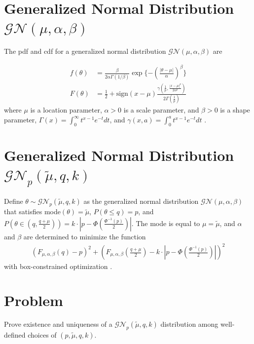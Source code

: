 \documentclass[useAMS,usenatbib]{biom}
\begin{document}
\section*{Generalized Normal Distribution $\mathcal{GN}(\mu,\alpha,\beta)$}
The pdf and cdf for a generalized normal distribution $\mathcal{GN}(\mu,\alpha,\beta)$ are

\begin{align*}
f(\theta)&=\frac{\beta}{2\alpha\Gamma(1/\beta)}\exp\{-(\frac{|\theta-\mu|}{\alpha})^\beta\}\\
F(\theta)&=\frac{1}{2}+\text{sign}(x-\mu)\frac{\gamma(\frac{1}{p},\frac{|x-\mu|^p}{2\alpha^p})}{2\Gamma(\frac{1}{p})}
\end{align*} where $\mu$ is a location parameter, $\alpha>0$ is a scale parameter, and $\beta>0$ is a shape parameter, $\Gamma(x)=\int_0^\infty t^{x-1}e^{-t}dt$, and $\gamma(x,a)=\int_0^a t^{x-1}e^{-t}dt$ \citep{Nadarajah2005}.

\section*{Generalized Normal Distribution $\mathcal{GN}_p(\tilde{\mu},q,k)$}
Define $\theta\sim\mathcal{GN}_p(\tilde{\mu},q,k)$ as the generalized normal distribution $\mathcal{GN}(\mu,\alpha,\beta)$ that satisfies mode$(\theta)=\tilde{\mu}$, $P(\theta\leq q)=p$, and $P(\theta\in(q,\frac{q+\mu}{2}))=k\cdot|p-\Phi(\frac{\Phi^{-1}(p)}{2})|$.
%
The mode is equal to $\mu=\tilde{\mu}$, and $\alpha$ and $\beta$ are determined to minimize the function 
\begin{align*}
(F_{\mu,\alpha,\beta}(q)-p)^2+(F_{\mu,\alpha,\beta}(\frac{q+\mu}{2})-k\cdot|p-\Phi(\frac{\Phi^{-1}(p)}{2})|)^2
\end{align*} with box-constrained optimization \citep{Byrd1995}. 

\section*{Problem}
Prove existence and uniqueness of a $\mathcal{GN}_p(\tilde{\mu},q,k)$ distribution among well-defined choices of $(p,\tilde{\mu},q,k)$.
\end{document}

